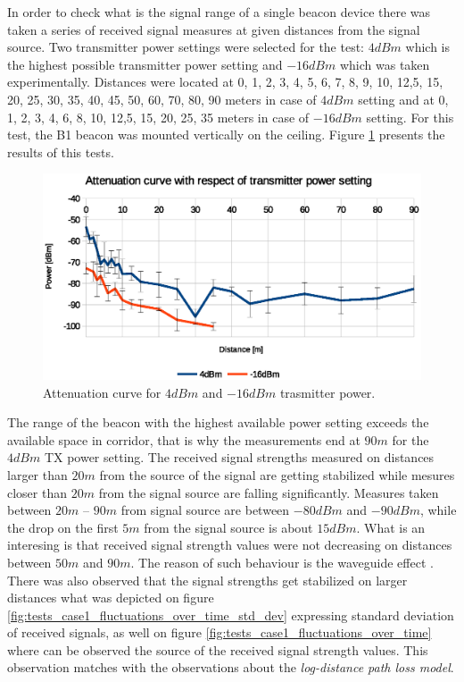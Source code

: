 \documentclass[../main.tex]{subfiles}
\begin{document}
In order to check what is the signal range of a single beacon device there was taken a series of received signal measures at given distances from the signal source. Two transmitter power settings were selected for the test: $4 dBm$ which is the highest possible transmitter power setting and $-16 dBm$ which was taken experimentally. Distances were located at 0, 1, 2, 3, 4, 5, 6, 7, 8, 9, 10, 12,5, 15, 20, 25, 30, 35, 40, 45, 50, 60, 70, 80, 90 meters in case of $4 dBm$ setting and at 0, 1, 2, 3, 4, 6, 8, 10, 12,5, 15, 20, 25, 35 meters in case of $-16 dBm$ setting. For this test, the B1 beacon was mounted vertically on the ceiling. Figure \ref{fig:tests_case1_attenuation} presents the results of this tests.

\begin{figure}[!htbp]
\includegraphics[width=\textwidth, keepaspectratio]{pictures/tests_case1_attenuation}
\centering
\caption{Attenuation curve for $4 dBm$ and $-16 dBm$ trasmitter power.}
\label{fig:tests_case1_attenuation}
\end{figure}

The range of the beacon with the highest available power setting exceeds the available space in corridor, that is why the measurements end at $90m$ for the $4dBm$ TX power setting. The received signal strengths measured on distances larger than $20m$ from the source of the signal are getting stabilized while mesures closer than $20m$ from the signal source are falling significantly. Measures taken between $20m$ -- $90m$ from signal source are between $-80 dBm$ and $-90 dBm$, while the drop on the first $5m$ from the signal source is about $15 dBm$. What is an interesing is that received signal strength values were not decreasing on distances between $50m$ and $90m$. The reason of such behaviour is the waveguide effect \cite{Thesis_CM}\cite{article_rf_propagation_practical_full}. There was also observed that the signal strengths get stabilized on larger distances what was depicted on figure \ref{fig:tests_case1_fluctuations_over_time_std_dev} expressing standard deviation of received signals, as well on figure \ref{fig:tests_case1_fluctuations_over_time} where can be observed the source of the received signal strength values. This observation matches with the observations about the \textit{log-distance path loss model}.
\end{document}

